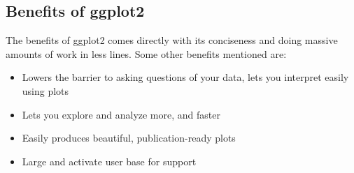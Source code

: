 \subsection{Benefits of ggplot2}
The benefits of ggplot2 comes directly with its conciseness and doing massive amounts of
work in less lines. Some other benefits mentioned are:
\begin{itemize}
    \item Lowers the barrier to asking questions of your data, lets you interpret easily
    using plots
    \item Lets you explore and analyze more, and faster
    \item Easily produces beautiful, publication-ready plots
    \item Large and activate user base for support
\end{itemize}

